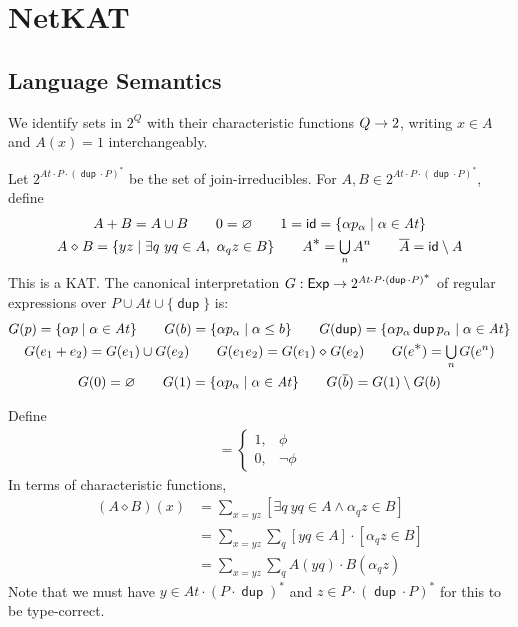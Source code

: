 \documentclass{article}
\newcommand\cset[1]{\{#1\}}
\newcommand\At{\ensuremath{\mathit{At}}}
\renewcommand\smash{\mathrel{\diamond}}
\newcommand\ssum{\mathop{\textstyle\sum}}
\newcommand\sbigcup{\mathop{\textstyle\bigcup}}
\newcommand\pdup{\mathop{\mathsf{dup}}}
\newcommand\Exp{\mathsf{Exp}}
\newcommand\bval[1]{[#1]}
\renewcommand\star{^{\textstyle *}}
\newcommand\id{\mathsf{id}}
\newcommand\setJI{2^{\At\cdot P\cdot(\pdup\cdot P)^{\scriptstyle *}}}
\begin{document}
\section{NetKAT}

\subsection*{Language Semantics}

We identify sets in $2^Q$ with their characteristic functions $Q\rightarrow 2$, writing $x\in A$ and $A(x)=1$ interchangeably.

Let $\setJI$ be the set of join-irreducibles. For $A,B\in\setJI$, define
\begin{gather*}
A+B = A\cup B \qquad
0 = \emptyset \qquad
1 = \id = \set{\alpha p_\alpha}{\alpha\in\At}\\
A\smash B = \set{yz}{\exists q\ yq\in A,\ \alpha_qz\in B} \qquad
A\star = \sbigcup_n A^n \qquad
\bar A = \id\setminus A
\end{gather*}
This is a KAT. The canonical interpretation $G:\Exp\fun\setJI$ of regular expressions over $P\cup\At\cup\cset\pdup$ is:
\begin{gather*}
G(p) = \set{\alpha p}{\alpha\in\At} \qquad
G(b) = \set{\alpha p_\alpha}{\alpha\leq b} \qquad
G(\pdup) = \set{\alpha p_\alpha\pdup p_\alpha}{\alpha\in\At}\\
G(e_1+e_2) = G(e_1)\cup G(e_2) \qquad
G(e_1e_2) = G(e_1)\smash G(e_2) \qquad
G(e\star) = \sbigcup_n G(e^n)\\
G(0) = \emptyset \qquad
G(1) = \set{\alpha p_\alpha}{\alpha\in\At} \qquad
G(\bar b) = G(1) \setminus G(b)
\end{gather*}

Define
\begin{gather*}
\bval\phi = \begin{cases}
1, & \phi\\
0, & \neg\phi
\end{cases}
\end{gather*}
In terms of characteristic functions,
\begin{align*}
(A\smash B)(x) &= \ssum_{x=yz}\bval{\exists q\ yq\in A\wedge\alpha_qz\in B}\\
&= \ssum_{x=yz}\ssum_q\bval{yq\in A}\cdot\bval{\alpha_qz\in B}\\
&= \ssum_{x=yz}\ssum_q A(yq)\cdot B(\alpha_qz)
\end{align*}
Note that we must have $y\in\At\cdot(P\cdot\pdup)\star$ and $z\in P\cdot(\pdup\cdot P)\star$ for this to be type-correct.
\end{document}
